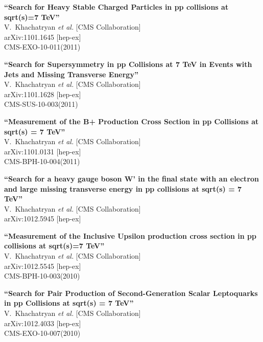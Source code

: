 \documentclass[10pt, a4paper]{article}
\begin{document}
\begin{thebibliography}{599}
{\bf ``Search for Heavy Stable Charged Particles in pp collisions at sqrt(s)=7 TeV''}
  \\{}V.~Khachatryan {\it et al.}  [CMS Collaboration]
  \\{}arXiv:1101.1645 [hep-ex]
\\{}CMS-EXO-10-011(2011)

{\bf ``Search for Supersymmetry in pp Collisions at 7 TeV in Events with Jets and Missing Transverse Energy''}
  \\{}V.~Khachatryan {\it et al.}  [CMS Collaboration]
  \\{}arXiv:1101.1628 [hep-ex]
\\{}CMS-SUS-10-003(2011)

{\bf ``Measurement of the B+ Production Cross Section in pp Collisions at sqrt(s) = 7 TeV''}
  \\{}V.~Khachatryan {\it et al.}  [CMS Collaboration]
  \\{}arXiv:1101.0131 [hep-ex]
\\{}CMS-BPH-10-004(2011)

{\bf ``Search for a heavy gauge boson W' in the final state with an electron and large missing transverse energy in pp collisions at sqrt(s) = 7
TeV''}
  \\{}V.~Khachatryan {\it et al.}  [CMS Collaboration]
  \\{}arXiv:1012.5945 [hep-ex]

{\bf ``Measurement of the Inclusive Upsilon production cross section in pp collisions at sqrt(s)=7 TeV''}
  \\{}V.~Khachatryan {\it et al.}  [CMS Collaboration]
  \\{}arXiv:1012.5545 [hep-ex]
\\{}CMS-BPH-10-003(2010)

{\bf ``Search for Pair Production of Second-Generation Scalar Leptoquarks in pp Collisions at sqrt(s) = 7 TeV''}
  \\{}V.~Khachatryan {\it et al.}  [CMS Collaboration]
  \\{}arXiv:1012.4033 [hep-ex]
\\{}CMS-EXO-10-007(2010)


\end{thebibliography}
\end{document}
